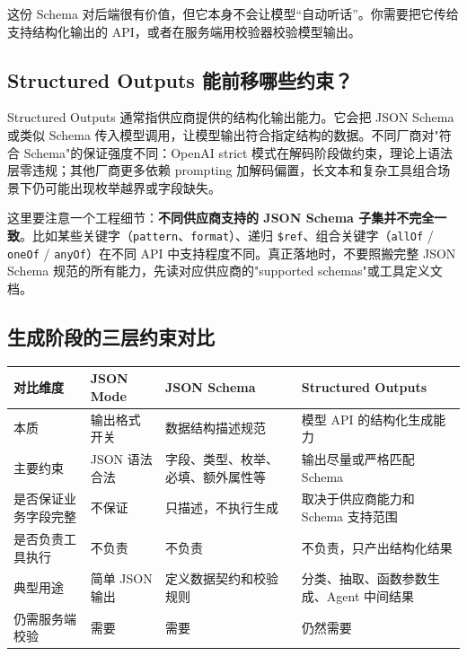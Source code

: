 \documentclass[10pt,a4paper]{ctexart}
\begin{document}
这份 Schema 对后端很有价值，但它本身不会让模型“自动听话”。你需要把它传给支持结构化输出的 API，或者在服务端用校验器校验模型输出。



\subsection{Structured Outputs 能前移哪些约束？}


Structured Outputs 通常指供应商提供的结构化输出能力。它会把 JSON Schema 或类似 Schema 传入模型调用，让模型输出符合指定结构的数据。不同厂商对"符合 Schema"的保证强度不同：OpenAI strict 模式在解码阶段做约束，理论上语法层零违规；其他厂商更多依赖 prompting 加解码偏置，长文本和复杂工具组合场景下仍可能出现枚举越界或字段缺失。



这里要注意一个工程细节：\textbf{不同供应商支持的 JSON Schema 子集并不完全一致}。比如某些关键字（\texttt{pattern}、\texttt{format}）、递归 \texttt{\$ref}、组合关键字（\texttt{allOf} / \texttt{oneOf} / \texttt{anyOf}）在不同 API 中支持程度不同。真正落地时，不要照搬完整 JSON Schema 规范的所有能力，先读对应供应商的"supported schemas"或工具定义文档。



\subsection{生成阶段的三层约束对比}

{\footnotesize
\begin{tabularx}{\textwidth}{|X|X|X|X|}
\hline
\textbf{对比维度} & \textbf{JSON Mode} & \textbf{JSON Schema} & \textbf{Structured Outputs} \\
\hline
本质 & 输出格式开关 & 数据结构描述规范 & 模型 API 的结构化生成能力 \\
\hline
主要约束 & JSON 语法合法 & 字段、类型、枚举、必填、额外属性等 & 输出尽量或严格匹配 Schema \\
\hline
是否保证业务字段完整 & 不保证 & 只描述，不执行生成 & 取决于供应商能力和 Schema 支持范围 \\
\hline
是否负责工具执行 & 不负责 & 不负责 & 不负责，只产出结构化结果 \\
\hline
典型用途 & 简单 JSON 输出 & 定义数据契约和校验规则 & 分类、抽取、函数参数生成、Agent 中间结果 \\
\hline
仍需服务端校验 & 需要 & 需要 & 仍然需要 \\
\hline
\end{tabularx}
}
\end{document}
